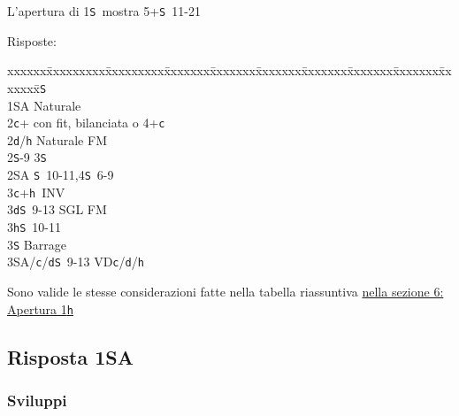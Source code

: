 \documentclass[a4paper,italian]{article}
\newcommand{\BS}{\small{\texttt{S}}}
\newcommand{\BC}{\small{\texttt{c}}}
\newcommand{\BD}{\small{\texttt{d}}}
\newcommand{\BH}{\small{\texttt{h}}}
\newenvironment{bidtable}
{\begin{tabbing}

    xxxxxx\=xxxxxxxxx\=xxxxxxxxx\=xxxxxxx\=xxxxxxx\=xxxxxxx\=xxxxxxx\=xxxxxxx\=xxxxxxx\=xxxxxxx\=\kill}
{\end{tabbing} }%
\begin{document}
\begin{multicols}{2}
    L'apertura di 1\BS\ mostra 5+\BS\ 11-21

    Risposte:
    \begin{bidtable}
        1\BS\+\\
        1\small{SA} \>\> Naturale\\
        2\BC \>+ con fit, bilanciata o 4+\BC \\
        2\BD/\BH \>\> Naturale FM\\
        2\BS \>-9 3\BS \\
        2\small{SA} \>\BS\ 10-11,4\BS\ 6-9\\
        3\BC \>+\BH\ INV\\
        3\BD \>\BS\ 9-13 SGL FM\\
        3\BH \>\BS\ 10-11\\
        3\BS \>\> Barrage\\
        3\small{SA}/\BC/\BD \>\BS\ 9-13 VD\BC /\BD /\BH \-
    \end{bidtable}

    Sono valide le stesse considerazioni fatte nella tabella riassuntiva \hyperref[1Maggiore]{nella sezione 6: Apertura 1\BH}

    \subsection{Risposta 1SA}

    \subsubsection{Sviluppi}


\end{multicols}
\end{document}

